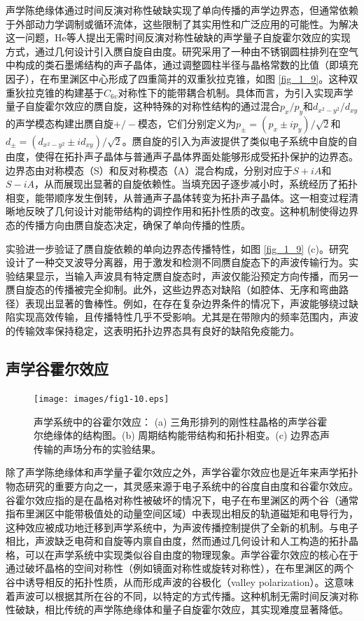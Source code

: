 声学陈绝缘体通过时间反演对称性破缺实现了单向传播的声学边界态，但通常依赖于外部动力学调制或循环流体，这些限制了其实用性和广泛应用的可能性。为解决这一问题，He等人提出无需时间反演对称性破缺的声学量子自旋霍尔效应的实现方式，通过几何设计引入赝自旋自由度\cite{i2}。研究采用了一种由不锈钢圆柱排列在空气中构成的类石墨烯结构的声子晶体，通过调整圆柱半径与晶格常数的比值（即填充因子），在布里渊区中心形成了四重简并的双重狄拉克锥，如图 \ref{fig_1_9}。这种双重狄拉克锥的构建基于$C_{6v}$对称性下的能带耦合机制。具体而言，为引入实现声学量子自旋霍尔效应的赝自旋，这种特殊的对称性结构的通过混合$p_x/p_y$和$d_{x^2-y^2}/d_{xy}$的声学模态构建出赝自旋$+/-$模态，它们分别定义为$p_{\pm} = (p_x\pm ip_y)/\sqrt{2}$和$d_{\pm} = (d_{x^2-y^2}\pm id_{xy})/\sqrt{2}$。赝自旋的引入为声波提供了类似电子系统中自旋的自由度，使得在拓扑声子晶体与普通声子晶体界面处能够形成受拓扑保护的边界态。边界态由对称模态（S）和反对称模态（A）混合构成，分别对应于$S+iA$和$S-iA$，从而展现出显著的自旋依赖性。当填充因子逐步减小时，系统经历了拓扑相变，能带顺序发生倒转，从普通声子晶体转变为拓扑声子晶体。这一相变过程清晰地反映了几何设计对能带结构的调控作用和拓扑性质的改变。这种机制使得边界态的传播方向由赝自旋态决定，确保了单向传播的性质。

实验进一步验证了赝自旋依赖的单向边界态传播特性，如图 \ref{fig_1_9} (c)。研究设计了一种交叉波导分离器，用于激发和检测不同赝自旋态下的声波传输行为。实验结果显示，当输入声波具有特定赝自旋态时，声波仅能沿预定方向传播，而另一赝自旋态的传播被完全抑制。此外，这些边界态对缺陷（如腔体、无序和弯曲路径）表现出显著的鲁棒性。例如，在存在复杂边界条件的情况下，声波能够绕过缺陷实现高效传输，且传播特性几乎不受影响。尤其是在带隙内的频率范围内，声波的传输效率保持稳定，这表明拓扑边界态具有良好的缺陷免疫能力。

\subsection{声学谷霍尔效应}

\begin{figure}[h!]
    \centering
    \texttt{[image: images/fig1-10.eps]} 
    \caption{声学系统中的谷霍尔效应\cite{i3}：
    (a) 三角形排列的刚性柱晶格的声学谷霍尔绝缘体的结构图。(b) 周期结构能带结构和拓扑相变。(c) 边界态声传输的声场分布的实验结果。
    }
    \label{fig_1_10}
\end{figure}

除了声学陈绝缘体和声学量子霍尔效应之外，声学谷霍尔效应也是近年来声学拓扑物态研究的重要方向之一，其灵感来源于电子系统中的谷度自由度和谷霍尔效应。谷霍尔效应指的是在晶格对称性被破坏的情况下，电子在布里渊区的两个谷（通常指布里渊区中能带极值处的动量空间区域）中表现出相反的轨道磁矩和电导行为，这种效应被成功地迁移到声学系统中，为声波传播控制提供了全新的机制。与电子相比，声波缺乏电荷和自旋等内禀自由度，然而通过几何设计和人工构造的拓扑晶格，可以在声学系统中实现类似谷自由度的物理现象。声学谷霍尔效应的核心在于通过破坏晶格的空间对称性（例如镜面对称性或旋转对称性），在布里渊区的两个谷中诱导相反的拓扑性质，从而形成声波的谷极化（valley polarization）。这意味着声波可以根据其所在谷的不同，以特定的方式传播。这种机制无需时间反演对称性破缺，相比传统的声学陈绝缘体和量子自旋霍尔效应，其实现难度显著降低。

